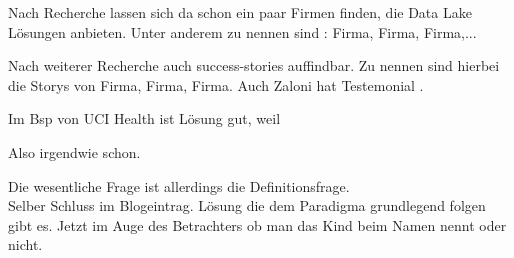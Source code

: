 \documentclass[twoside,twocolumn]{article}
\begin{document}
Nach Recherche lassen sich da schon ein paar Firmen finden, die Data Lake Lösungen anbieten.
Unter anderem zu nennen sind : Firma\cite{c1}, Firma\cite{c2}, Firma\cite{c3},...

Nach weiterer Recherche auch success-stories auffindbar. 
Zu nennen sind hierbei die Storys von Firma\cite{ss1}, Firma\cite{ss2}, Firma\cite{ss3}. Auch Zaloni hat Testemonial \cite{ss4}.

Im Bsp von UCI Health ist Lösung gut, weil \cite{src1}\cite{ss2} 

Also irgendwie schon.


Die wesentliche Frage ist allerdings die Definitionsfrage.\\
Selber Schluss im Blogeintrag. Lösung die dem Paradigma grundlegend folgen gibt es. Jetzt im Auge des Betrachters ob man das Kind beim Namen nennt oder nicht.










\end{document}
